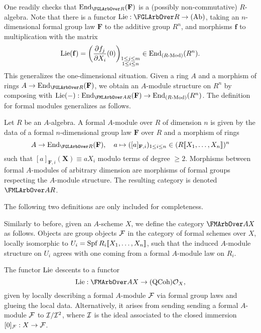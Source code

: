 One readily checks that $\End_{\FGLArbOver R}(\mathbf F)$ is a (possibly 
non-commutative) $R$-algebra. Note that there is 
a functor $\Lie: \FGLArbOver R \to \Ab$, taking an $n$-dimensional 
formal group law $\mathbf F$ to the additive group $R^n$, and morphisms
$\mathbf f$ to multiplication with the matrix 
\begin{equation*}
  \operatorname{Lie}(\mathbf f) = \left(\frac{\partial f_j}{\partial X_i} (0) \right)_{\substack{1 \leq j \leq m\\1 \leq i \leq n}} \in \operatorname{End}_{{({R}\text-\mathrm{Mod})}}(R^n).
\end{equation*}
This generalizes the one-dimensional situation.
Given a ring $A$ and a morphism of rings
$A \to \End_{\FGLArbOver R}(\mathbf F)$, we obtain an $A$-module structure on $R^n$
by composing with $\Lie(-): \End_{\FMLArbOver A R}(\mathbf F) \to \End_{\Mod R}(R^n)$.
The definition for formal modules generalizes as follows. 
\begin{defi}
  Let $R$ be an $A$-algebra. A formal $A$-module over $R$ of dimension $n$ is
  given by the data of 
  a formal $n$-dimensional group law $\mathbf F$ over $R$ and a morphism of rings
  \begin{equation*}
    A \to \End_{\FGLArbOver R} (\mathbf F), \quad a \mapsto ([a]_{\mathbf F,i}
    )_{1 \leq i \leq n} \in (R \llbr X_1, \dots, X_n \rrbr )^n
  \end{equation*}
  such that $[a]_{\mathbf F,i}(\mathbf X) \equiv a X_i$ modulo terms of degree 
  $\geq 2$. Morphisms between formal $A$-modules of arbitrary dimension are 
  morphisms of formal groups respecting the $A$-module structure. 
  The resulting category is denoted $\FMLArbOver A R$.
\end{defi}
\color{blue}The following two definitions are only included for completeness.
\begin{defi}
  Similarly to before, given an $A$-scheme $X$, we define the category
  $\FMArbOver A X$ as follows. Objects are group objects $\mathcal{F}$ in the category
  of formal schemes over $X$, locally isomorphic to $U_i = \operatorname{Spf} R_i\llbracket X_1,
  \dots, X_n\rrbracket$, such that the induced $A$-module structure on $U_i$
  agrees with one coming from a formal $A$-module law on $R_i$. 
\end{defi}

\begin{defi}
  The functor $\operatorname{Lie}$ descents to a functor 
  \begin{equation*}
    \Lie: \FMArbOver A X \to \QCoh {\cO_X}, 
  \end{equation*}
  given by locally describing a formal $A$-module $\mathcal{F}$ via formal group laws
  and glueing the local data. Alternatively, it arises from sending 
  sending a formal $A$-module $\mathcal{F}$ to $\mathcal{I} / \mathcal{I}^2$, where $\mathcal{I}$ is the ideal
  associated to the closed immersion $[0]_{\mathcal{F}}: X \to \mathcal{F}$. 
\end{defi}
\color{black}

